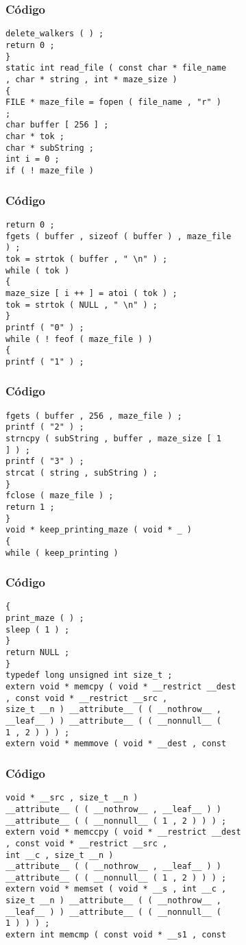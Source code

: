 \documentclass{beamer}
\begin{document}
\begin{frame}[fragile]
\frametitle{C\'odigo}
\begin{verbatim}
delete_walkers ( ) ; 
return 0 ; 
} 
static int read_file ( const char * file_name 
, char * string , int * maze_size ) 
{ 
FILE * maze_file = fopen ( file_name , "r" ) 
; 
char buffer [ 256 ] ; 
char * tok ; 
char * subString ; 
int i = 0 ; 
if ( ! maze_file ) 
\end{verbatim}
\end{frame}
\begin{frame}[fragile]
\frametitle{C\'odigo}
\begin{verbatim}
return 0 ; 
fgets ( buffer , sizeof ( buffer ) , maze_file 
) ; 
tok = strtok ( buffer , " \n" ) ; 
while ( tok ) 
{ 
maze_size [ i ++ ] = atoi ( tok ) ; 
tok = strtok ( NULL , " \n" ) ; 
} 
printf ( "0" ) ; 
while ( ! feof ( maze_file ) ) 
{ 
printf ( "1" ) ; 
\end{verbatim}
\end{frame}
\begin{frame}[fragile]
\frametitle{C\'odigo}
\begin{verbatim}
fgets ( buffer , 256 , maze_file ) ; 
printf ( "2" ) ; 
strncpy ( subString , buffer , maze_size [ 1 
] ) ; 
printf ( "3" ) ; 
strcat ( string , subString ) ; 
} 
fclose ( maze_file ) ; 
return 1 ; 
} 
void * keep_printing_maze ( void * _ ) 
{ 
while ( keep_printing ) 
\end{verbatim}
\end{frame}
\begin{frame}[fragile]
\frametitle{C\'odigo}
\begin{verbatim}
{ 
print_maze ( ) ; 
sleep ( 1 ) ; 
} 
return NULL ; 
} 
typedef long unsigned int size_t ; 
extern void * memcpy ( void * __restrict __dest 
, const void * __restrict __src , 
size_t __n ) __attribute__ ( ( __nothrow__ , 
__leaf__ ) ) __attribute__ ( ( __nonnull__ ( 
1 , 2 ) ) ) ; 
extern void * memmove ( void * __dest , const 
\end{verbatim}
\end{frame}
\begin{frame}[fragile]
\frametitle{C\'odigo}
\begin{verbatim}
void * __src , size_t __n ) 
__attribute__ ( ( __nothrow__ , __leaf__ ) ) 
__attribute__ ( ( __nonnull__ ( 1 , 2 ) ) ) ; 
extern void * memccpy ( void * __restrict __dest 
, const void * __restrict __src , 
int __c , size_t __n ) 
__attribute__ ( ( __nothrow__ , __leaf__ ) ) 
__attribute__ ( ( __nonnull__ ( 1 , 2 ) ) ) ; 
extern void * memset ( void * __s , int __c , 
size_t __n ) __attribute__ ( ( __nothrow__ , 
__leaf__ ) ) __attribute__ ( ( __nonnull__ ( 
1 ) ) ) ; 
extern int memcmp ( const void * __s1 , const 
\end{verbatim}
\end{frame}
\end{document}

